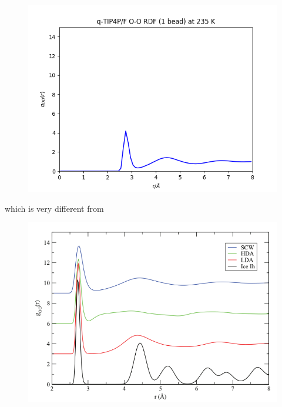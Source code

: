 \documentclass[12pt,reqno]{amsart}
\numberwithin{equation}{section}
\begin{document}
\begin{enumerate}
\begin{figure}[H]
\centering
\includegraphics[scale=0.6]{0_0-1bead-bonded-tip4pF-235}
\end{figure}
which is very different from 
\begin{figure}[H]
\centering
\includegraphics[scale=0.6]{skinner_ice}
\end{figure}
\end{enumerate}
\end{document}
